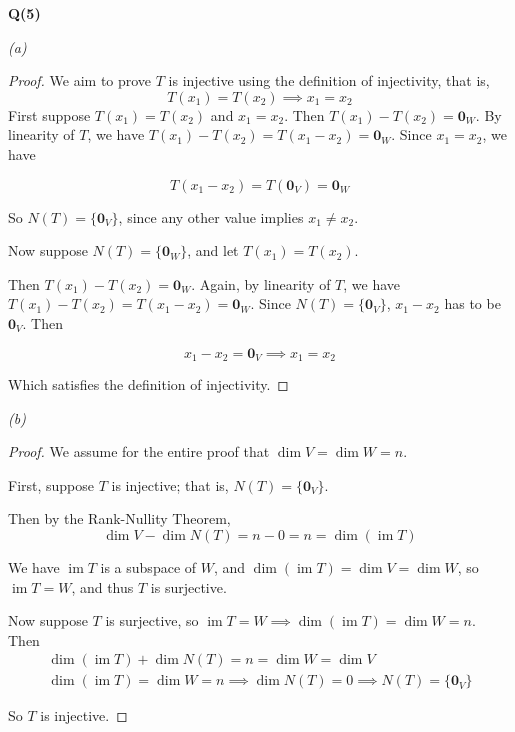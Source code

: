 \documentclass[12pt, a4paper]{article}
\newcommand{\im}{\operatorname{im}}
\begin{document}
\textbf{Q(5)}

\textit{(a)}
\begin{proof}
    We aim to prove $T$ is injective using the definition of
    injectivity, that is,
    \[
        T(x_1) = T(x_2) \implies x_1 = x_2
    \]
    First suppose $T(x_1) = T(x_2)$ and $x_1 = x_2$. Then
    $T(x_1) - T(x_2) = \textbf{0}_W$.
    By linearity of $T$, we have
    $T(x_1) - T(x_2) = T(x_1 - x_2) = \textbf{0}_W$. Since
    $x_1 = x_2$, we have

    \[T(x_1 - x_2) = T(\textbf{0}_V) = \textbf{0}_W\]

    So $N(T) = \{\textbf{0}_V\}$, since any other value implies
    $x_1 \neq x_2$.

    Now suppose $N(T) = \{\textbf{0}_W\}$, and let $T(x_1) = T(x_2)$.

    Then $T(x_1) - T(x_2) = \textbf{0}_W$. Again, by linearity of $T$,
    we have $T(x_1) - T(x_2) = T(x_1 - x_2) = \textbf{0}_W$. Since
    $N(T) = \{\textbf{0}_V\}$, $x_1 - x_2$ has to be $\textbf{0}_V$.
    Then 
    
    \[x_1 - x_2 = \textbf{0}_V \implies x_1 = x_2\]

    Which satisfies the definition of injectivity.
\end{proof}

\textit{(b)}
\begin{proof}
    We assume for the entire proof that $\dim V = \dim W = n$.

    First, suppose $T$ is injective; that is, $N(T) = \{\textbf{0}_V\}$.

    Then by the Rank-Nullity Theorem,
    \[
        \dim V - \dim N(T) = n - 0 = n = \dim (\im T)
    \]

    We have $\im T$ is a subspace of $W$, and
    $\dim (\im T) = \dim V = \dim W$, so $\im T = W$, and thus
    $T$ is surjective.

    Now suppose $T$ is surjective, so
    $\im T = W \implies \dim (\im T) = \dim W = n$. Then
    \begin{gather*}
        \dim (\im T) + \dim N(T) = n = \dim W = \dim V\\
        \dim (\im T) = \dim W = n \implies \dim N(T) = 0 \implies N(T)
        = \{\textbf{0}_V\}
    \end{gather*}

    So $T$ is injective.
\end{proof}
\end{document}
